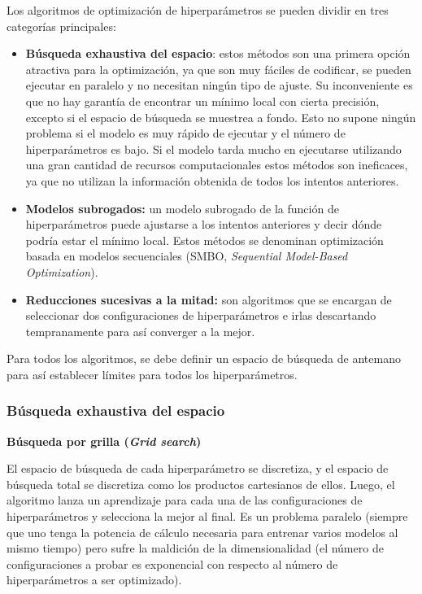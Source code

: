 \documentclass[a4paper,12pt]{article}
\begin{document}
Los algoritmos de optimización de hiperparámetros se pueden dividir en tres categorías principales:
\begin{itemize}
	\item \textbf{Búsqueda exhaustiva del espacio}: estos métodos son una primera opción atractiva para la optimización, ya que son muy fáciles de codificar, se pueden ejecutar en paralelo y no necesitan ningún tipo de ajuste. Su inconveniente es que no hay garantía de encontrar un mínimo local con cierta precisión, excepto si el espacio de búsqueda se muestrea a fondo. Esto no supone ningún problema si el modelo es muy rápido de ejecutar y el número de hiperparámetros es bajo. Si el modelo tarda mucho en ejecutarse utilizando una gran cantidad de recursos computacionales estos métodos son ineficaces, ya que no utilizan la información obtenida de todos los intentos anteriores.
	\item \textbf{Modelos subrogados:} un modelo subrogado de la función de hiperparámetros puede ajustarse a los intentos anteriores y decir dónde podría estar el mínimo local. Estos métodos se denominan optimización basada en modelos secuenciales (SMBO, \textit{Sequential Model-Based Optimization}).
	\item \textbf{Reducciones sucesivas a la mitad:} son algoritmos que se encargan de seleccionar dos configuraciones de hiperparámetros e irlas descartando tempranamente para así converger a la mejor.
\end{itemize}

Para todos los algoritmos, se debe definir un espacio de búsqueda de antemano para así establecer límites para todos los hiperparámetros.

\subsubsection{Búsqueda exhaustiva del espacio}
\textbf{Búsqueda por grilla (\textit{Grid search})}

El espacio de búsqueda de cada hiperparámetro se discretiza, y el espacio de búsqueda total se discretiza como los productos cartesianos de ellos. Luego, el algoritmo lanza un aprendizaje para cada una de las configuraciones de hiperparámetros y selecciona la mejor al final. Es un problema paralelo (siempre que uno tenga la potencia de cálculo necesaria para entrenar varios modelos al mismo tiempo) pero sufre la maldición de la dimensionalidad (el número de configuraciones a probar es exponencial con respecto al número de hiperparámetros a ser optimizado).
\end{document}
